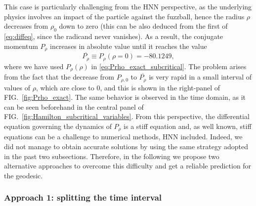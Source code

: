 \documentclass[prd,aps,a4paper,eqsecnum,nofootinbib,floatfix,twocolumn,superscriptaddress]{revtex4-2}
\begin{document}
This case is particularly challenging from the HNN perspective, as the underlying physics involves an impact of the particle against the fuzzball, hence the radius $\rho$ decreases from $\rho_0$ down to zero (this can be also deduced from the first of \eqref{eq:diffeq}, since the radicand never vanishes). As a result, the conjugate momentum $P_\rho$ increases in absolute value until it reaches the value
\begin{equation} \label{minimal_prho_sub_critical}
    \overline{P_{\rho}} \equiv P_\rho(\rho=0)= -80.1249,
\end{equation}
where we have used $P_\rho(\rho)$ in \eqref{eq:Prho_exact_subcritical}. The problem arises from the fact that the decrease from $P_{\rho,0}$ to $\overline{P_\rho}$ is very rapid in a small interval of values of $\rho$, which are close to 0, and this is shown in the right-panel of FIG.~\ref{fig:Prho_exact}. The same behavior is observed in the time domain, as it can be  seen beforehand in the central panel of FIG.~\ref{fig:Hamilton_subcritical_variables}. From this perspective, the differential equation governing the dynamics of $P_\rho$ is a stiff equation and, as well known, stiff equations can be a challenge to numerical methods, HNN included. Indeed, we did not manage to obtain accurate solutions by using the same strategy adopted in the past two subsections. Therefore, in the following we propose two alternative approaches to overcome this difficulty and get a reliable prediction for the geodesic.

\subsubsection{\label{sec:splitting}Approach 1: splitting the time interval}
\end{document}

